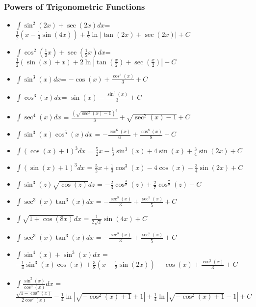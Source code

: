 \hypertarget{powers-of-trigonometric-functions}{%
\subsubsection{Powers of Trigonometric
Functions}\label{powers-of-trigonometric-functions}}

\begin{itemize}
\tightlist
\item
  \(\displaystyle\int \sin^2(2x) + \sec(2x) dx\)=
  \(\frac{1}{2}\left(x-\frac{1}{4}\sin \left(4x\right)\right)+\frac{1}{2}\ln \left|\tan \left(2x\right)+\sec \left(2x\right)\right|+C\)
\item
  \(\displaystyle\int \cos^2 \left (\frac{1}{2}x \right) + \sec \left(\frac{1}{2}x\right)dx\)=
  \(\frac{1}{2}\left(\sin \left(x\right)+x\right)+2\ln \left|\tan \left(\frac{x}{2}\right)+\sec \left(\frac{x}{2}\right)\right|+C\)
\item
  \(\displaystyle\int \sin^3(x) dx\)=
  \(-\cos \left(x\right)+\frac{\cos ^3\left(x\right)}{3}+C\)
\item
  \(\displaystyle\int \cos^3(x) dx\)=
  \(\sin \left(x\right)-\frac{\sin ^3\left(x\right)}{3}+C\)
\item
  \(\displaystyle\int \sec^4(x) dx\) =
  \(\frac{\left(\sqrt{\sec ^2\left(x\right)-1}\right)^3}{3}+\sqrt{\sec ^2\left(x\right)-1}+C\)
\item
  \(\displaystyle\int \sin^3(x)\cos^5(x) dx\) =
  \(-\frac{\cos ^6\left(x\right)}{6}+\frac{\cos ^8\left(x\right)}{8}+C\)
\item
  \(\displaystyle\int (\cos(x)+1)^3 dx\) =
  \(\frac{5}{2}x-\frac{1}{3}\sin ^3\left(x\right)+4\sin \left(x\right)+\frac{3}{4}\sin \left(2x\right)+C\)
\item
  \(\displaystyle\int (\sin(x)+1)^3 dx\) =
  \(\frac{5}{2}x+\frac{1}{3}\cos ^3\left(x\right)-4\cos \left(x\right)-\frac{3}{4}\sin \left(2x\right)+C\)
\item
  \(\displaystyle\int \sin^3(z)\sqrt{\cos(z)} dz\) =
  \(-\frac{2}{3}\cos ^{\frac{3}{2}}\left(z\right)+\frac{2}{7}\cos ^{\frac{7}{2}}\left(z\right)+C\)
\item
  \(\displaystyle\int \sec^3(x)\tan^3(x) dx\) =
  \(-\frac{\sec ^3\left(x\right)}{3}+\frac{\sec ^5\left(x\right)}{5}+C\)
\item
  \(\displaystyle\int \sqrt{1+\cos(8x)} dx\) =
  \(\frac{1}{2\sqrt{2}}\sin \left(4x\right)+C\)
\item
  \(\displaystyle\int \sec^3(x)\tan^3(x) dx\) =
  \(-\frac{\sec ^3\left(x\right)}{3}+\frac{\sec ^5\left(x\right)}{5}+C\)
\item
  \(\displaystyle\int \sin^4(x) + \sin^3(x) dx\) =
  \(-\frac{1}{4}\sin ^3\left(x\right)\cos \left(x\right)+\frac{3}{8}\left(x-\frac{1}{2}\sin \left(2x\right)\right)-\cos \left(x\right)+\frac{\cos ^3\left(x\right)}{3}+C\)
\item
  \(\displaystyle\int \frac{\sin^2(x)}{\cos^3(x)} dx\) =
  \(\frac{\sqrt{1-\cos ^2\left(x\right)}}{2\cos ^2\left(x\right)}-\frac{1}{4}\ln \left|\sqrt{-\cos ^2\left(x\right)+1}+1\right|+\frac{1}{4}\ln \left|\sqrt{-\cos ^2\left(x\right)+1}-1\right|+C\)
\end{itemize}

